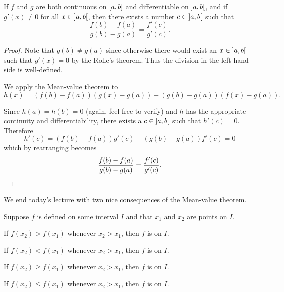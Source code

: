 \begin{corollary}
	If $f$ and $g$ are both continuous on $\interval{a}{b}$ and differentiable on $\interval[open]{a}{b}$, and if $g'(x) \neq 0$ for all $x \in \interval[open]{a}{b}$, then there exists a number $c \in \interval[open]{a}{b}$ such that
	\[
		\frac{f(b) - f(a)}{g(b) - g(a)} = \frac{f'(c)}{g'(c)}.
	\]
\end{corollary}

\begin{proof}
	Note that $g(b) \neq g(a)$ since otherwise there would exist an $x \in \interval[open]{a}{b}$ such that $g'(x) = 0$ by the Rolle's theorem.
	Thus the division in the left-hand side is well-defined.

	We apply the Mean-value theorem to
	\[
		h(x) = (f(b) - f(a))(g(x) - g(a)) - (g(b) - g(a)) (f(x) - g(a)).
	\]

	\noindent
	Since $h(a) = h(b) = 0$ (again, feel free to verify) and $h$ has the appropriate continuity and differentiability, there exists a $c \in \interval[open]{a}{b}$ such that $h'(c) = 0$.
	Therefore
	\[
		h'(c) = (f(b) - f(a)) g'(c) - (g(b) - g(a)) f'(c) = 0
	\]
	which by rearranging becomes
	\[
		\frac{f(b) - f(a)}{g(b) - g(a)} = \frac{f'(c)}{g'(c)}. \qedhere
	\]
\end{proof}

\noindent
We end today's lecture with two nice consequences of the Mean-value theorem.

\begin{definition}\label{lec4:monotonicity}
	Suppose $f$ is defined on some interval $I$ and that $x_1$ and $x_2$ are points on $I$.
	\begin{romanlist}
		\item If $f(x_2) > f(x_1)$ whenever $x_2 > x_1$, then $f$ is  on $I$.
		\item If $f(x_2) < f(x_1)$ whenever $x_2 > x_1$, then $f$ is  on $I$.
		\item If $f(x_2) \geq f(x_1)$ whenever $x_2 > x_1$, then $f$ is  on $I$.
		\item If $f(x_2) \leq f(x_1)$ whenever $x_2 > x_1$, then $f$ is  on $I$.
	\end{romanlist}
\end{definition}

